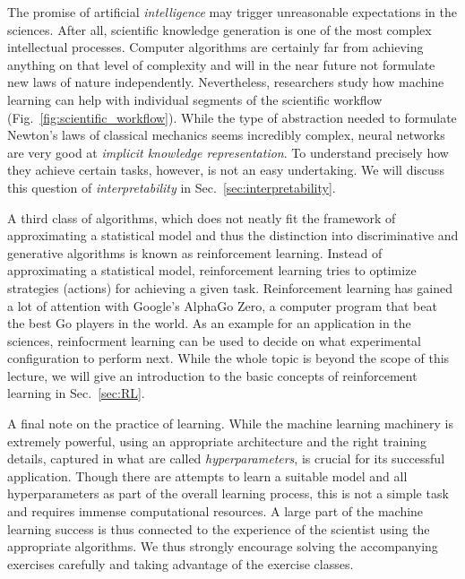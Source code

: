 The promise of artificial \emph{intelligence} may trigger unreasonable expectations in the sciences. After all,  scientific knowledge generation is one of the most complex intellectual processes.
Computer algorithms are certainly far from achieving anything on that level of complexity and will in the near future not formulate new laws of nature independently. Nevertheless, researchers study how machine learning can help with individual segments of the scientific workflow (Fig.~\ref{fig:scientific_workflow}).
While the type of abstraction needed to formulate Newton's laws of classical mechanics seems incredibly complex, neural networks are very good at \emph{
implicit knowledge representation}. To understand precisely how they achieve certain tasks, however, is not an easy undertaking. We will discuss this question of \emph{interpretability} in Sec.~\ref{sec:interpretability}.


A third class of algorithms, which does not neatly fit the framework of approximating a statistical model and thus the distinction into discriminative and generative algorithms is known as reinforcement learning. Instead of approximating a statistical model, reinforcement learning tries to optimize strategies (actions) for achieving a given task. Reinforcement learning has gained a lot of attention with Google's AlphaGo Zero, a computer program that beat the best Go players in the world. As an example for an application in the sciences, reinfocrment learning can be used to decide on what experimental configuration to perform next. While the whole topic is beyond the scope of this lecture, we will give an introduction to the basic concepts of reinforcement learning in Sec.~\ref{sec:RL}.


A final note on the practice of learning. While the machine learning machinery is extremely powerful, using an appropriate architecture and the right training details, captured in what are called \emph{hyperparameters}, is crucial for its successful application. Though there are attempts to learn a suitable model and all hyperparameters as part of the overall learning process, this is not a simple task and requires immense computational resources. A large part of the machine learning success is thus connected to the experience of the scientist using the appropriate algorithms. 
We thus strongly encourage solving the accompanying exercises carefully and taking advantage of the exercise classes.

